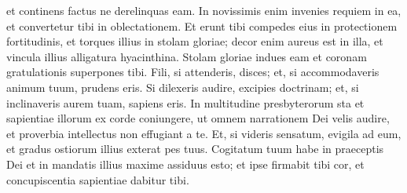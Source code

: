 \begin{biblechapter}
\begin{biblechapter}
\begin{biblechapter}
\begin{biblechapter}
\begin{biblechapter}
\begin{biblechapter}
 et continens factus ne derelinquas eam.
 \verse In novissimis enim invenies requiem in ea,
 et convertetur tibi in oblectationem.
 \verse Et erunt tibi compedes eius in protectionem fortitudinis,
 et torques illius in stolam gloriae;
 \verse decor enim aureus est in illa,
 et vincula illius alligatura hyacinthina.
 \verse Stolam gloriae indues eam
 et coronam gratulationis superpones tibi.
 \verse Fili, si attenderis, disces;
 et, si accommodaveris animum tuum, prudens eris.
 \verse Si dilexeris audire, excipies doctrinam;
 et, si inclinaveris aurem tuam, sapiens eris.
 \verse In multitudine presbyterorum sta
 et sapientiae illorum ex corde coniungere,
 ut omnem narrationem Dei velis audire,
 et proverbia intellectus non effugiant a te.
 \verse Et, si videris sensatum, evigila ad eum,
 et gradus ostiorum illius exterat pes tuus.
 \verse Cogitatum tuum habe in praeceptis Dei
 et in mandatis illius maxime assiduus esto;
 et ipse firmabit tibi cor,
 et concupiscentia sapientiae dabitur tibi.
 

\end{biblechapter}
\end{biblechapter}
\end{biblechapter}
\end{biblechapter}
\end{biblechapter}
\end{biblechapter}
